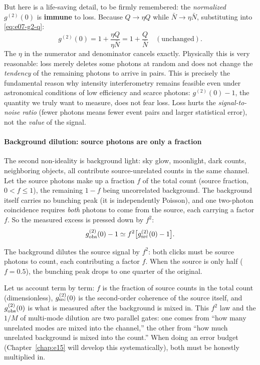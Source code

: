 But here is a life-saving detail, to be firmly remembered: the \emph{normalized} \(g^{(2)}(0)\) is \textbf{immune} to loss. Because \(Q\to\eta Q\) while \(\bar N\to\eta\bar N\), substituting into \eqref{eq:e07-g2-q}:
\[
  g^{(2)}(0)=1+\frac{\eta Q}{\eta\bar N}=1+\frac{Q}{\bar N}\quad(\text{unchanged}).
\]
The \(\eta\) in the numerator and denominator cancels exactly. Physically this is very reasonable: loss merely deletes some photons at random and does not change the \emph{tendency} of the remaining photons to arrive in pairs. This is precisely the fundamental reason why intensity interferometry remains feasible even under astronomical conditions of low efficiency and scarce photons: \(g^{(2)}(0)-1\), the quantity we truly want to measure, does not fear loss. Loss hurts the \emph{signal-to-noise ratio} (fewer photons means fewer event pairs and larger statistical error), not the \emph{value} of the signal.

\paragraph{Background dilution: source photons are only a fraction}
\label{sec:e07-background}

The second non-ideality is background light: sky glow, moonlight, dark counts, neighboring objects, all contribute source-unrelated counts in the same channel. Let the source photons make up a fraction \(f\) of the total count (source fraction, \(0<f\le1\)), the remaining \(1-f\) being uncorrelated background. The background itself carries no bunching peak (it is independently Poisson), and one two-photon coincidence requires \emph{both} photons to come from the source, each carrying a factor \(f\). So the measured excess is pressed down by \(f^2\):
\begin{equation}
  g^{(2)}_{\rm obs}(0)-1\simeq f^2\big[g^{(2)}_{\rm src}(0)-1\big].
  \label{eq:e07-background}
\end{equation}
\begin{formulaexplain}
The background dilutes the source signal by \(f^2\): both clicks must be source photons to count, each contributing a factor \(f\). When the source is only half (\(f=0.5\)), the bunching peak drops to one quarter of the original.
\end{formulaexplain}

Let us account term by term: \(f\) is the fraction of source counts in the total count (dimensionless), \(g^{(2)}_{\rm src}(0)\) is the second-order coherence of the source itself, and \(g^{(2)}_{\rm obs}(0)\) is what is measured after the background is mixed in. This \(f^2\) law and the \(1/M\) of multi-mode dilution are two parallel gates: one comes from ``how many unrelated modes are mixed into the channel,'' the other from ``how much unrelated background is mixed into the count.'' When doing an error budget (Chapter~\ref{chap:e15} will develop this systematically), both must be honestly multiplied in.


